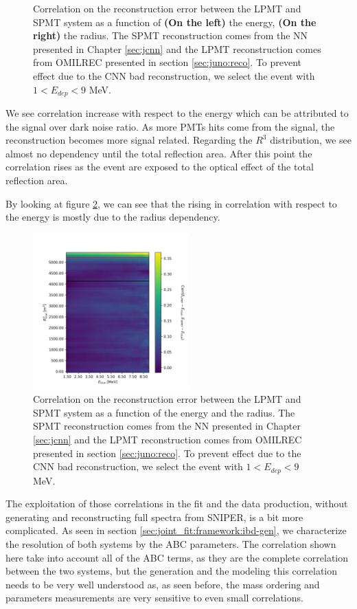 \documentclass[../main.tex]{subfiles}
\begin{document}
\begin{figure}[ht]
\begin{subfigure}[t]{0.48\linewidth}
  \end{subfigure}
  \caption{Correlation on the reconstruction error between the LPMT and SPMT system as a function of \textbf{(On the left)} the energy, \textbf{(On the right)} the radius. The SPMT reconstruction comes from the NN presented in Chapter \ref{sec:jcnn} and the LPMT reconstruction comes from OMILREC presented in section \ref{sec:juno:reco}. To prevent effect due to the CNN bad reconstruction, we select the event with $1 < E_{dep} < 9$ MeV.}
  \label{fig:joint_fit:empirical_corr:E_a_R}
\end{figure}

We see correlation increase with respect to the energy which can be attributed to the signal over dark noise ratio. As more PMTs hits come from the signal, the reconstruction becomes more signal related. Regarding the $R^3$ distribution, we see almost no dependency until the total reflection area. After this point the correlation rises as the event are exposed to the optical effect of the total reflection area.

By looking at figure \ref{fig:joint_fit:empirical_corr:E_R}, we can see that the rising in correlation with respect to the energy is mostly due to the radius dependency.

\begin{figure}[ht]
  \centering
  \includegraphics[height=6cm]{images/joint_fit/E_R_corr.png}
  \caption{Correlation on the reconstruction error between the LPMT and SPMT system as a function of  the energy and the radius. The SPMT reconstruction comes from the NN presented in Chapter \ref{sec:jcnn} and the LPMT reconstruction comes from OMILREC presented in section \ref{sec:juno:reco}. To prevent effect due to the CNN bad reconstruction, we select the event with $1 < E_{dep} < 9$ MeV.}
  \label{fig:joint_fit:empirical_corr:E_R}
\end{figure}

The exploitation of those correlations in the fit and the data production, without generating and reconstructing full spectra from SNIPER, is a bit more complicated. As seen in section \ref{sec:joint_fit:framework:ibd-gen}, we characterize the resolution of both systems by the ABC parameters. The correlation shown here take into account all of the ABC terms, as they are the complete correlation between the two systems, but the generation and the modeling this correlation needs to be very well understood as, as seen before, the mass ordering and parameters measurements are very sensitive to even small correlations.
\end{document}

